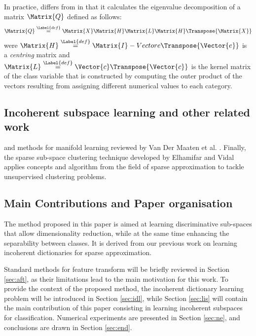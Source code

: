 \documentclass{article}
\def \cat{c} 			%
\def \definition{\overset{\Label{def}}{=}}	%
\begin{document}
In practice,  differs from  in that it calculates the eigenvalue decomposition of a matrix $\Matrix{Q}$ defined as follows:
\begin{equation}
\Matrix{Q} \definition \Matrix{X}\Matrix{H}\Matrix{L}\Matrix{H}\Transpose{\Matrix{X}}
\end{equation}
were $\Matrix{H} \definition \Matrix{I} - \\Vector{e}\Transpose{\Vector{e}}$ is a \emph{centring} matrix and $\Matrix{L} \definition \Vector{\cat}\Transpose{\Vector{\cat}}$ is the kernel matrix of the class variable that is constructed by computing the outer product of the vectors resulting from assigning different numerical values to each category.

\subsection{Incoherent subspace learning and other related work}


and methods for manifold learning reviewed by Van Der Maaten et al. \cite{Van-Der-Maaten2009Di}. Finally, the sparse sub-space clustering technique developed by Elhamifar and Vidal \cite{Elhamifar2013Sp} applies concepts and algorithm from the field of sparse approximation to tackle unsupervised clustering problems.


\subsection{Main Contributions and Paper organisation}
The method proposed in this paper is aimed at learning discriminative sub-spaces that allow dimensionality reduction, while at the same time enhancing the separability between classes. It is derived from our previous work on learning incoherent dictionaries for sparse approximation.

Standard methods for feature transform will be briefly reviewed in Section \ref{sec:aft}, as their limitations lead to the main motivation for this work. To provide the context of the proposed method, the incoherent dictionary learning problem will be introduced in Section \ref{sec:idl}, while Section \ref{sec:lis} will contain the main contribution of this paper consisting in learning incoherent subspaces for classification. Numerical experiments are presented in Section \ref{sec:ne}, and conclusions are drawn in Section \ref{sec:end}.
\end{document}
